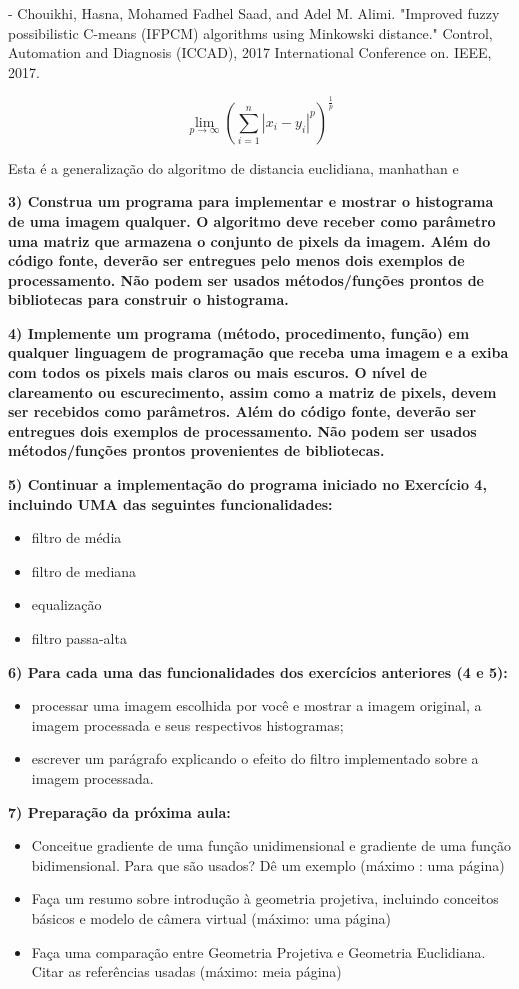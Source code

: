 \documentclass[a4paper]{sbgames}               %
\begin{document}
- Chouikhi, Hasna, Mohamed Fadhel Saad, and Adel M. Alimi. "Improved fuzzy possibilistic C-means (IFPCM) algorithms using Minkowski distance." Control, Automation and Diagnosis (ICCAD), 2017 International Conference on. IEEE, 2017.

$$ \lim_{p\to\infty}{\left(\sum_{i=1}^n |x_i-y_i|^p\right)^\frac{1}{p}} $$

Esta é a generalização do algoritmo de distancia euclidiana, manhathan e 

\textbf{3) Construa um programa para implementar e mostrar o histograma de uma imagem qualquer. O algoritmo deve receber como parâmetro uma matriz que armazena o conjunto de pixels da imagem. Além do código fonte, deverão ser entregues pelo menos dois exemplos de processamento. Não podem ser usados métodos/funções prontos de bibliotecas para construir o histograma.}

\textbf{4) Implemente um programa (método, procedimento, função) em qualquer
linguagem de programação que receba uma imagem e a exiba com todos
os pixels mais claros ou mais escuros. O nível de clareamento ou
escurecimento, assim como a matriz de pixels, devem ser recebidos
como parâmetros. Além do código fonte, deverão ser entregues dois
exemplos de processamento. Não podem ser usados métodos/funções
prontos provenientes de bibliotecas.}

\textbf{5) Continuar a implementação do programa iniciado no Exercício 4, incluindo UMA das seguintes funcionalidades:}

\begin{itemize}
\item filtro de média
\item filtro de mediana
\item equalização
\item filtro passa-alta
\end{itemize}

\textbf{6)  Para cada uma das funcionalidades dos exercícios anteriores (4 e 5):}
\begin{itemize}
\item processar uma imagem escolhida por você e mostrar a imagem original, a imagem processada e seus respectivos histogramas;
\item escrever um parágrafo explicando o efeito do filtro implementado sobre a
imagem processada.
\end{itemize}

\textbf{7) Preparação da próxima aula:}
\begin{itemize}
\item Conceitue gradiente de uma função unidimensional e gradiente de uma função bidimensional. Para que são usados? Dê um exemplo (máximo :
uma página)
\item Faça um resumo sobre introdução à geometria projetiva, incluindo
conceitos básicos e modelo de câmera virtual (máximo: uma página)
\item Faça uma comparação entre Geometria Projetiva e Geometria Euclidiana.
Citar as referências usadas (máximo: meia página)
\end{itemize}
\end{document}
